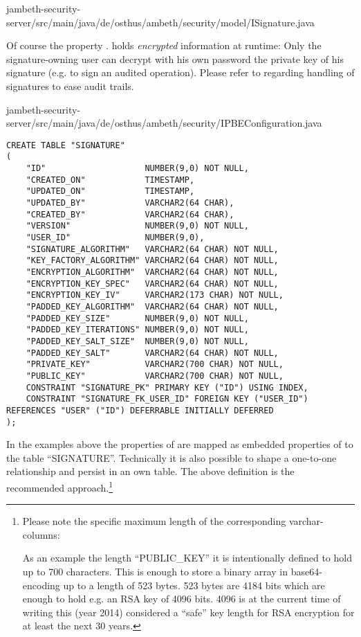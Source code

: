 	{jambeth-security-server/src/main/java/de/osthus/ambeth/security/model/ISignature.java}

Of course the property . holds \emph{encrypted} information at runtime: Only the signature-owning user can decrypt with his own password the private key of his signature (e.g. to sign an audited operation). Please refer to  regarding handling of signatures to ease audit trails.

	{jambeth-security-server/src/main/java/de/osthus/ambeth/security/IPBEConfiguration.java}

\begin{lstlisting}[style=SQL-Oracle,caption={Example schema definition to persist the \AMBETH{} \type{ISignature}-entity (Oracle SQL)}]
CREATE TABLE "SIGNATURE"
(	
	"ID"         			NUMBER(9,0) NOT NULL,
	"CREATED_ON" 			TIMESTAMP,
	"UPDATED_ON" 			TIMESTAMP,
	"UPDATED_BY" 			VARCHAR2(64 CHAR),
	"CREATED_BY" 			VARCHAR2(64 CHAR),
	"VERSION"    			NUMBER(9,0) NOT NULL,
	"USER_ID"				NUMBER(9,0),
	"SIGNATURE_ALGORITHM"	VARCHAR2(64 CHAR) NOT NULL,
	"KEY_FACTORY_ALGORITHM"	VARCHAR2(64 CHAR) NOT NULL,
	"ENCRYPTION_ALGORITHM"	VARCHAR2(64 CHAR) NOT NULL,
	"ENCRYPTION_KEY_SPEC"	VARCHAR2(64 CHAR) NOT NULL,
	"ENCRYPTION_KEY_IV"		VARCHAR2(173 CHAR) NOT NULL,
	"PADDED_KEY_ALGORITHM"	VARCHAR2(64 CHAR) NOT NULL,
	"PADDED_KEY_SIZE"		NUMBER(9,0) NOT NULL,
	"PADDED_KEY_ITERATIONS"	NUMBER(9,0) NOT NULL,
	"PADDED_KEY_SALT_SIZE"	NUMBER(9,0) NOT NULL,
	"PADDED_KEY_SALT"		VARCHAR2(64 CHAR) NOT NULL,
	"PRIVATE_KEY"			VARCHAR2(700 CHAR) NOT NULL,
	"PUBLIC_KEY"			VARCHAR2(700 CHAR) NOT NULL,
	CONSTRAINT "SIGNATURE_PK" PRIMARY KEY ("ID") USING INDEX,
	CONSTRAINT "SIGNATURE_FK_USER_ID" FOREIGN KEY ("USER_ID") REFERENCES "USER" ("ID") DEFERRABLE INITIALLY DEFERRED
);
\end{lstlisting}
In the examples above the properties of  are mapped as embedded properties of  to the table ``SIGNATURE''. Technically it is also possible to shape a one-to-one relationship and persist  in an own table. The above definition is the recommended approach.\footnote{Please note the specific maximum length of the corresponding varchar-columns:\newline

As an example the length ``PUBLIC\_KEY'' it is intentionally defined to hold up to 700 characters. This is enough to store a binary array in base64-encoding up to a length of 523 bytes. 523 bytes are 4184 bits which are enough to hold e.g. an RSA key of 4096 bits. 4096 is at the current time of writing this (year 2014) considered a ``safe'' key length for RSA encryption for at least the next 30 years.\cite{nsa01}
}